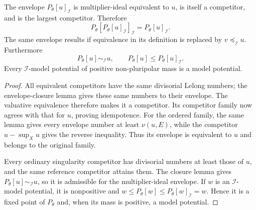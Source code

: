 \begin{proposition}\label{prop:multiplier-envelope-projection}
The envelope $P_\theta[u]_{\mathcal I}$ is multiplier-ideal equivalent to $u$, is itself a competitor, and is the largest competitor. Therefore
\[
 P_\theta[P_\theta[u]_{\mathcal I}]_{\mathcal I}
                =P_\theta[u]_{\mathcal I}.
\]
The same envelope results if equivalence in its definition is replaced by $v\preceq_{\mathcal I}u$. Furthermore
\[
 P_\theta[u]\sim_{\mathcal I}u,\qquad
 P_\theta[u]\leq P_\theta[u]_{\mathcal I}.
\]
Every $\mathcal I$-model potential of positive non-pluripolar mass is a model potential.
\end{proposition}
\begin{proof}
All equivalent competitors have the same divisorial Lelong numbers; the envelope-closure lemma gives these same numbers to their envelope. The valuative equivalence therefore makes it a competitor. Its competitor family now agrees with that for $u$, proving idempotence. For the ordered family, the same lemma gives every envelope number at least $\nu(u,E)$, while the competitor $u-\sup_Xu$ gives the reverse inequality. Thus its envelope is equivalent to $u$ and belongs to the original family.

Every ordinary singularity competitor has divisorial numbers at least those of $u$, and the same reference competitor attains them. The closure lemma gives $P_\theta[u]\sim_{\mathcal I}u$, so it is admissible for the multiplier-ideal envelope. If $w$ is an $\mathcal I$-model potential, it is nonpositive and
$w\leq P_\theta[w]\leq P_\theta[w]_{\mathcal I}=w$.
Hence it is a fixed point of $P_\theta$ and, when its mass is positive, a model potential.
\end{proof}

